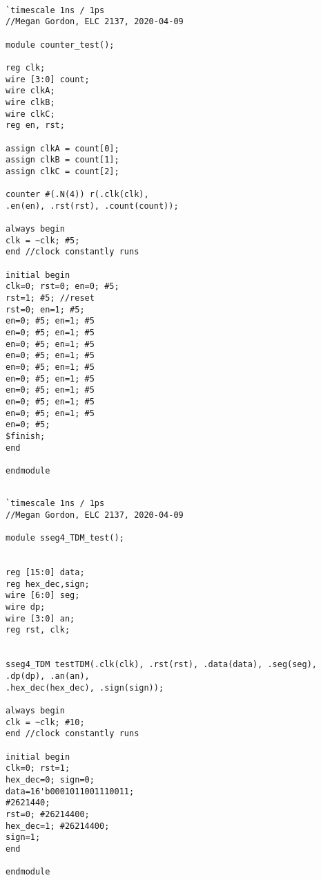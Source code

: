 \documentclass[11pt]{article}
\begin{document}
\begin{lstlisting}[style=Verilog,caption=Counter Test Bench Code,label=code:ex ]

`timescale 1ns / 1ps
//Megan Gordon, ELC 2137, 2020-04-09

module counter_test();

reg clk;
wire [3:0] count;
wire clkA;
wire clkB;
wire clkC;
reg en, rst;

assign clkA = count[0];
assign clkB = count[1];
assign clkC = count[2];

counter #(.N(4)) r(.clk(clk), 
.en(en), .rst(rst), .count(count));

always begin 
clk = ~clk; #5;
end //clock constantly runs

initial begin
clk=0; rst=0; en=0; #5;
rst=1; #5; //reset
rst=0; en=1; #5;
en=0; #5; en=1; #5
en=0; #5; en=1; #5
en=0; #5; en=1; #5
en=0; #5; en=1; #5
en=0; #5; en=1; #5
en=0; #5; en=1; #5
en=0; #5; en=1; #5
en=0; #5; en=1; #5
en=0; #5; en=1; #5
en=0; #5;
$finish;
end

endmodule

\end{lstlisting}
\clearpage

\begin{lstlisting}[style=Verilog,caption=7-Seg Driver Test Bench Code,label=code:ex ]

`timescale 1ns / 1ps
//Megan Gordon, ELC 2137, 2020-04-09

module sseg4_TDM_test();


reg [15:0] data;
reg hex_dec,sign;
wire [6:0] seg;
wire dp;
wire [3:0] an;
reg rst, clk;


sseg4_TDM testTDM(.clk(clk), .rst(rst), .data(data), .seg(seg), .dp(dp), .an(an),
.hex_dec(hex_dec), .sign(sign));

always begin 
clk = ~clk; #10;
end //clock constantly runs

initial begin
clk=0; rst=1;
hex_dec=0; sign=0;
data=16'b0001011001110011;
#2621440;
rst=0; #26214400;
hex_dec=1; #26214400;
sign=1; 
end

endmodule

\end{lstlisting}
\end{document}
